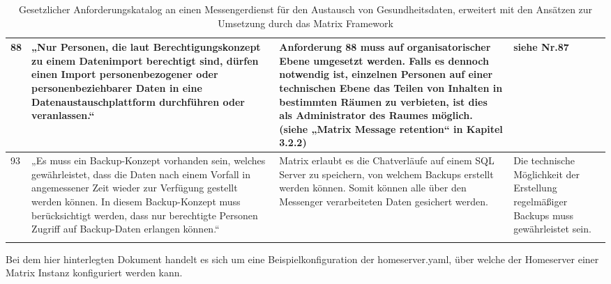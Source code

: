 \begin{longtable}{p{0.6cm}|p{4cm}|p{5cm}|p{5cm}}
  \\ \hline
88 &
  „Nur Personen, die laut Berechtigungskonzept zu einem Datenimport berechtigt sind, dürfen einen Import personenbezogener oder personenbeziehbarer Daten in eine Datenaustauschplattform durchführen oder veranlassen.“ &
  Anforderung 88 muss auf organisatorischer Ebene umgesetzt werden. Falls es dennoch notwendig ist, einzelnen Personen auf einer technischen Ebene das Teilen von Inhalten in bestimmten Räumen zu verbieten, ist dies als Administrator des Raumes möglich. (siehe „Matrix Message retention“ in Kapitel 3.2.2) &
  siehe Nr.87
  \\ \hline
93 &
  „Es muss ein Backup-Konzept vorhanden sein, welches gewährleistet, dass die Daten nach einem Vorfall in angemessener Zeit wieder zur Verfügung gestellt werden können. In diesem Backup-Konzept muss berücksichtigt werden, dass nur berechtigte Personen Zugriff auf Backup-Daten erlangen können.“ &
  Matrix erlaubt es die Chatverläufe auf einem SQL Server zu speichern, von welchem Backups erstellt werden können. Somit können alle über den Messenger verarbeiteten Daten gesichert werden. &
  Die technische Möglichkeit der Erstellung regelmäßiger Backups muss gewährleistet sein.
  \\ \hline
  \caption{Gesetzlicher Anforderungskatalog an einen Messengerdienst für den Austausch von Gesundheitsdaten, erweitert mit den Ansätzen zur Umsetzung durch das Matrix Framework} 
\end{longtable}
\newpage
{}

Bei dem hier hinterlegten Dokument handelt es sich um eine Beispielkonfiguration der homeserver.yaml, über welche der Homeserver einer Matrix Instanz konfiguriert werden kann.

